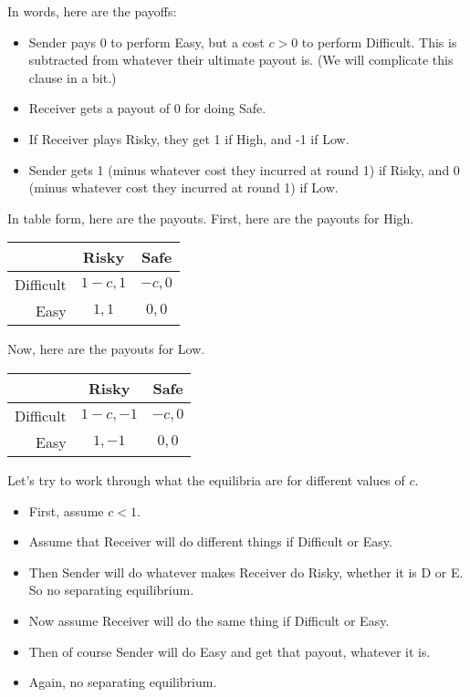 \documentclass[
  11pt,
]{article}
\providecommand{\tightlist}{%
  \setlength{\itemsep}{0pt}\setlength{\parskip}{0pt}}
\begin{document}
In words, here are the payoffs:

\begin{itemize}
\tightlist
\item
  Sender pays 0 to perform Easy, but a cost \(c > 0\) to perform
  Difficult. This is subtracted from whatever their ultimate payout is.
  (We will complicate this clause in a bit.)
\item
  Receiver gets a payout of 0 for doing Safe.
\item
  If Receiver plays Risky, they get 1 if High, and -1 if Low.
\item
  Sender gets 1 (minus whatever cost they incurred at round 1) if Risky,
  and 0 (minus whatever cost they incurred at round 1) if Low.
\end{itemize}

In table form, here are the payouts. First, here are the payouts for
High.

\begin{longtable}[]{@{}rcc@{}}
\toprule
& Risky & Safe \\
\midrule
\endhead
Difficult & \(1-c, 1\) & \(-c, 0\) \\
Easy & \(1, 1\) & \(0, 0\) \\
\bottomrule
\end{longtable}

Now, here are the payouts for Low.

\begin{longtable}[]{@{}rcc@{}}
\toprule
& Risky & Safe \\
\midrule
\endhead
Difficult & \(1-c, -1\) & \(-c, 0\) \\
Easy & \(1, -1\) & \(0, 0\) \\
\bottomrule
\end{longtable}

Let's try to work through what the equilibria are for different values
of \(c\).

\begin{itemize}
\tightlist
\item
  First, assume \(c < 1\).
\item
  Assume that Receiver will do different things if Difficult or Easy.
\item
  Then Sender will do whatever makes Receiver do Risky, whether it is D
  or E. So no separating equilibrium.
\item
  Now assume Receiver will do the same thing if Difficult or Easy.
\item
  Then of course Sender will do Easy and get that payout, whatever it
  is.
\item
  Again, no separating equilibrium.
\end{itemize}
\end{document}
